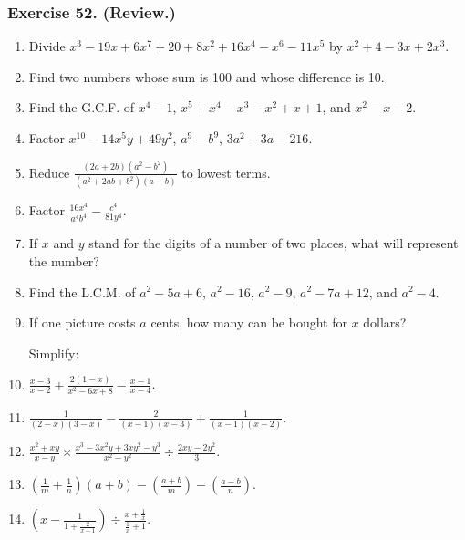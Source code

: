\documentclass{book}
\begin{document}
\subsubsection*{Exercise 52. (Review.)}

\begin{enumerate}
\item Divide $x^3 - 19x + 6x^7 + 20 + 8x^2 + 16x^4-x^6-11x^5$
by $x^2 + 4-3x+2x^3$.

\item Find two numbers whose sum is 100 and whose
difference is 10.

\item Find the G.C.F. of $x^4-1$, $x^5+ x^4-x^3-x^2 + x + 1$, and
$x^2 - x - 2$.

\item Factor $x^{10} - 14x^5y + 49y^2$, $a^9-b^9$, $3a^2-3a-216$.

\item Reduce $\displaystyle
\frac{(2a+2b)(a^2-b^2)}{(a^2+2ab+b^2)(a-b)}$ to lowest terms.

\item Factor $\displaystyle
\frac{16x^4}{a^4b^4}-\frac{c^4}{81y^4}$.

\item If $x$ and $y$ stand for the digits of a number of two
places, what will represent the number?

\item Find the L.C.M. of $a^2-5a + 6$, $a^2-16$, $a^2-9$, $a^2- 7a
+ 12$, and $a^2 - 4$.

\item If one picture costs $a$ cents, how many can be bought
for $x$ dollars?

Simplify:

\item $\displaystyle \frac{x - 3}{x - 2} + \frac{2 (1 - x)}{x^2 -
6x + 8} - \frac{x - 1}{x - 4}$.

\item $\displaystyle \frac{1}{(2 - x)(3 - x)} - \frac{2}{(x - 1)(x
- 3)} + \frac{1}{(x - 1)(x - 2)}$.

\item $\displaystyle \frac{x^2 + xy}{x - y} \times \frac{x^3 -
3x^2y + 3xy^2 - y^3}{x^2 - y^2} \div \frac{2xy - 2y^2}{3}$.

\item $\displaystyle \left( \frac{1}{m} + \frac{1}{n} \right) (a +
b) - \left( \frac{a + b}{m} \right) - \left( \frac{a - b}{n}
\right)$.

\item $\displaystyle \left( x - \frac{1}{1 + \frac{2}{x - 1}}
\right) \div \frac{x + \frac{1}{x}}{\frac{1}{x} + 1}$.


\end{enumerate}
\end{document}
